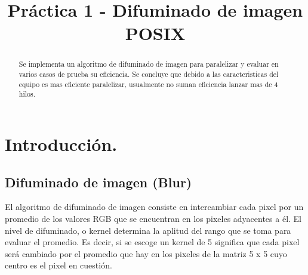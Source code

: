 \documentclass{IEEEtran}
\begin{document}
%
\title{Práctica 1 - Difuminado de imagen POSIX}


\author{
}


\maketitle

\begin{abstract}
Se implementa un algoritmo de difuminado de imagen para paralelizar 
y evaluar en varios casos de prueba su eficiencia. Se concluye que debido 
a las caracteristicas del equipo es mas eficiente paralelizar, usualmente
no suman eficiencia lanzar mas de 4 hilos.
\end{abstract}





%
\IEEEpeerreviewmaketitle



\section{Introducción.}


\subsection{Difuminado de imagen (Blur)}
El algoritmo de difuminado de imagen consiste en intercambiar 
cada pixel por un promedio de los valores RGB que se encuentran en 
los pixeles adyacentes a él. El nivel de difuminado, o kernel determina
 la aplitud del rango que se toma para evaluar el promedio. Es decir, 
 si se escoge un kernel de 5 significa que cada pixel será cambiado por 
 el promedio que hay en los pixeles de la matriz 5 x 5 cuyo centro es el 
 pixel en cuestión.
\end{document}
